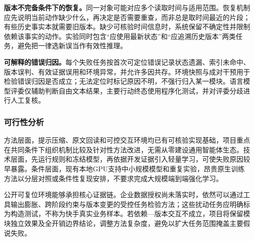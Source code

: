 \textbf{版本不完备条件下的恢复。}同一对象可能对应多个读取时间与适用范围。恢复机制应先说明当前动作缺少什么，再决定是否需要重查，而非总是取时间最近的片段；有些历史事实本就需要旧版本。缺少可核验时间信息时，系统保留不确定性并限制依赖该事实的动作。实验同时包含“应使用最新状态”和“应追溯历史版本”两类任务，避免把一律选新误当作有效性推理。

\textbf{可解释的错误归因。}每个失败任务按首次可定位错误记录状态遗漏、索引未命中、版本误判、有效证据误用和环境异常，并允许多因共存。环境快照与成对干预用于检验错误归因是否成立；无法定位时标记原因不明，不强行归入某一模块。语言模型评委仅辅助判断自由文本结果，主要行动终态使用程序化测试，并对评委分歧进行人工复核。

\subsubsection{可行性分析}
方法层面，提示压缩、原文回读和可控交互环境均已有可核验实现基础，项目重点在共同条件下组织机制比较及针对性方法改进，无需从零建设通用智能体生态。技术层面，先运行规则和冻结模型，再依据开发证据引入轻量学习，可使失败原因较早暴露。条件层面，现有本地GPU支持中小规模模型和重复实验，昂贵原生训练方法以分层对照或条件性复现安排，不要求完成大规模端到端强化学习。

公开可复位环境能够承担核心证据链。企业数据授权尚未落实时，依然可以通过工具输出膨胀、跨阶段约束与版本变更的受控任务检验方法；这些扰动任务应明确标为构造测试，不称为快手真实业务样本。若依赖—版本交互不成立，项目将保留模块独立效果及全开销边界结论，调整方法复杂度，避免以扩大任务范围掩盖主要假说失败。
